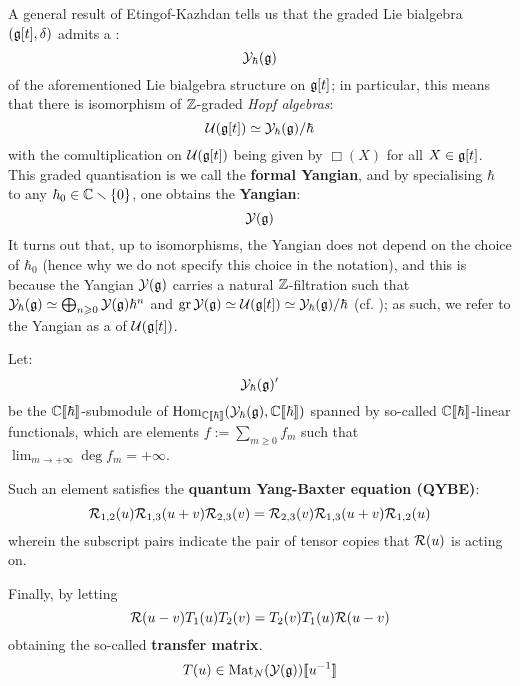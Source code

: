             A general result of Etingof-Kazhdan tells us that the graded Lie bialgebra $(\mathfrak{g}[t], \delta)$ admits a :
                $$\mathcal{Y}_{\hbar}(\mathfrak{g})$$
            of the aforementioned Lie bialgebra structure on $\mathfrak{g}[t]$; in particular, this means that there is isomorphism of $\mathbb{Z}$-graded \textit{Hopf algebras}:
                $$\mathcal{U}(\mathfrak{g}[t]) \simeq \mathcal{Y}_{\hbar}(\mathfrak{g})/\hbar$$
            with the comultiplication on $\mathcal{U}(\mathfrak{g}[t])$ being given by $\Box(X)$ for all $X \in \mathfrak{g}[t]$. This graded quantisation is we call the \textbf{formal Yangian}, and by specialising $\hbar$ to any $\hbar_0 \in \mathbb{C} \smallsetminus \{0\}$, one obtains the \textbf{Yangian}:
                $$\mathcal{Y}(\mathfrak{g})$$
            It turns out that, up to isomorphisms, the Yangian does not depend on the choice of $\hbar_0$ (hence why we do not specify this choice in the notation), and this is because the Yangian $\mathcal{Y}(\mathfrak{g})$ carries a natural $\mathbb{Z}$-filtration such that $\mathcal{Y}_{\hbar}(\mathfrak{g}) \simeq \bigoplus_{n \geqslant 0} \mathcal{Y}(\mathfrak{g}) \hbar^n$ and $\operatorname{gr} \mathcal{Y}(\mathfrak{g}) \simeq \mathcal{U}(\mathfrak{g}[t]) \simeq \mathcal{Y}_{\hbar}(\mathfrak{g})/\hbar$ (cf. \cite{drinfeld_original_yangian_paper}); as such, we refer to the Yangian as a  of $\mathcal{U}(\mathfrak{g}[t])$.

            Let:
                $$\mathcal{Y}_{\hbar}(\mathfrak{g})'$$
            be the $\mathbb{C}[\![\hbar]\!]$-submodule of $\mathrm{Hom}_{\mathbb{C}[\![\hbar]\!]}( \mathcal{Y}_{\hbar}(\mathfrak{g}), \mathbb{C}[\![\hbar]\!] )$ spanned by so-called  $\mathbb{C}[\![\hbar]\!]$-linear functionals, which are elements $f := \sum_{m \geq 0} f_m$ such that $\lim_{m \to +\infty} \deg f_m = +\infty$.
                
            Such an element satisfies the \textbf{quantum Yang-Baxter equation (QYBE)}:
                \begin{equation} \label{equation: QYBE}
                    \mathcal{R}_{1, 2}(u) \mathcal{R}_{1, 3}(u + v) \mathcal{R}_{2, 3}(v) = \mathcal{R}_{2, 3}(v) \mathcal{R}_{1, 3}(u + v) \mathcal{R}_{1, 2}(u)
                \end{equation}
            wherein the subscript pairs indicate the pair of tensor copies that $\mathcal{R}(u)$ is acting on.

            Finally, by letting 
                \begin{equation} \label{equation: RTT_relation}
                    \mathcal{R}(u - v) T_1(u) T_2(v) = T_2(v) T_1(u) \mathcal{R}(u - v)
                \end{equation}
            obtaining the so-called \textbf{transfer matrix}.
                $$T(u) \in \mathrm{Mat}_N( \mathcal{Y}(\mathfrak{g}) )[\![u^{-1}]\!]$$

